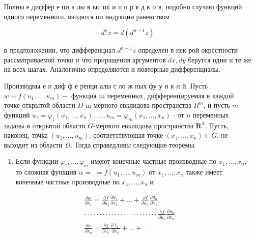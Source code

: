 \documentclass[10pt]{article}
\begin{document}
Полны е диффер е ци а лы в ыс ші и п о р я д к о в, подобно случаю функций одного переменного, вводятся по индукции равенством



\[

d^{n} z=d\left(d^{n-1} z\right)

\]



в предположении, что дифференциал $d^{n-1} z$ определен в нек-рой окрестности рассматриваемой точки и что приращения аргументов $d x, d y$ берутся одни и те же на всех шагах. Аналогично определяются и повторные дифференциалы.



Производны е и диф ф е ренци алы с ло ж ных фу у н к и й. Пусть $w=f\left(u_{1}, \ldots, u_{m}\right)-$ функция $m$ переменных, дифференцируемая в каждой точке открытой области $D$ m-мерного евклидова пространства $R^{m}$, и пусть $m$ функций $u_{1}=\varphi_{1}\left(x_{1}, \ldots, x_{n}\right)$, $\ldots, u_{m}=\varphi_{m}\left(x_{1}, \ldots, x_{n}\right)$ - от $n$ переменных заданы в открытой области $G$-мерного евклидова пространства $\boldsymbol{R}^{n}$. Пусть, наконец, точка $\left(u_{1}, \ldots, u_{m}\right)$, соответствующая точке $\left(x_{1}, \ldots, x_{n}\right) \in G$, не выходит из области $D$. Тогда справедливы следующие теоремы:



\begin{enumerate}

  \item Если функции $\varphi_{1}, \ldots, \varphi_{m}$ имеют конечные частные производные по $x_{1}, \ldots, x_{n}$, то сложная функция $w=$ $=f\left(u_{1}, \ldots, u_{m}\right)$ от $x_{1}, \ldots, x_{n}$ также имеет конечные частные производные по $x_{1}, \ldots, x_{n}$ и

\end{enumerate}



\[

\begin{aligned}

& \frac{\partial w}{\partial x_{1}}=\frac{\partial f}{\partial u_{1}} \frac{\partial u_{1}}{\partial x_{1}}+\ldots+\frac{\partial f}{\partial u_{n}} \frac{\partial u_{n}}{\partial x_{1}}, \\

& \cdot \cdot \cdot \cdot \cdot \cdot \cdot \cdot \cdot \cdot \cdot \cdot \cdot \cdot \cdot \cdot \cdot \cdot \cdot \cdot \cdot \cdot \cdot \cdot \frac{\partial f}{\partial u_{n}} \frac{\partial u_{n}}{\partial x_{n}} . \\

& \frac{\partial w}{\partial x_{n}}=\frac{\partial f}{\partial u_{1}} \frac{\partial \ell_{1}}{\partial x_{n}}+\ldots+.

\end{aligned}

\]
\end{document}
